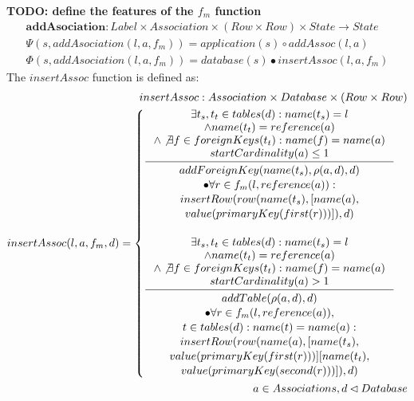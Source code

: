 \documentclass[11pt]{article}
\begin{document}
\textbf{TODO: define the features of the $f_m$ function}
\begin{align*}
\mathbf{addAsociation} : Label \times Association \times (Row \times Row) \times State \rightarrow State \\
\Psi(s, addAsociation(l, a, f_m)) = application(s) \circ addAssoc(l, a) \\
\Phi(s, addAsociation(l, a, f_m)) = database(s) \bullet insertAssoc(l, a, f_m)
\end{align*}
The $insertAssoc$ function is defined as:
\begin{align*}
insertAssoc : Association \times Database \times (Row \times Row) \\
insertAssoc(l, a, f_m, d) = \begin{cases}
\inference{ \exists t_s, t_t \in tables(d) : name(t_s) = l\\ \wedge name(t_t) = reference(a) \\ \wedge \not \exists f \in foreignKeys(t_t) : name(f) = name(a) \\ startCardinality(a) \leq 1}{\begin{gathered}
addForeignKey(name(t_s), \rho(a,d), d) \\ \bullet \forall r \in f_m(l, reference(a)) : \\ insertRow(row(name(t_s), [name(a), \\ value(primaryKey(first(r)))]), d)
\end{gathered}
 }
 \\ \\
\inference{ \exists t_s, t_t \in tables(d) : name(t_s) = l \\ \wedge name(t_t) = reference(a) \\ \wedge \not \exists f \in foreignKeys(t_t) : name(f) = name(a) \\ startCardinality(a) > 1}{\begin{gathered} addTable(\rho(a,d),d) \\ \bullet \forall r \in f_m(l, reference(a)),\\ t \in tables(d) : name(t) = name(a) : \\ insertRow(row(name(a), [name(t_s), \\ value(primaryKey(first(r)))] [name(t_t), \\ value(primaryKey(second(r)))]), d)
\end{gathered}
 } 
 \end{cases}\\
 a \in Associations, d \lhd Database
\end{align*}
\end{document}
